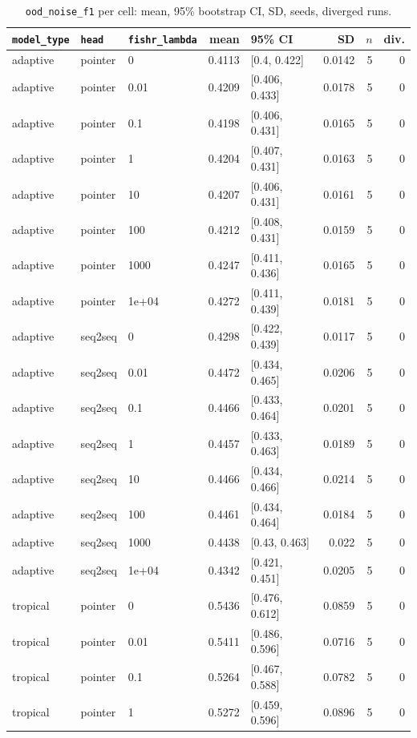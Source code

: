\documentclass[10pt]{article}
\begin{document}
{\small
\begin{longtable}{lllrlrrr}
\caption{\texttt{ood\_noise\_f1} per cell: mean, 95\% bootstrap CI, SD, seeds, diverged runs.}\label{tab:summary-ood_noise_f1}\\
\toprule
\texttt{model\_type} & \texttt{head} & \texttt{fishr\_lambda} & mean & 95\% CI & SD & $n$ & div.\\
\midrule
\endhead
adaptive & pointer & 0 & 0.4113 & [0.4, 0.422] & 0.0142 & 5 & 0\\
adaptive & pointer & 0.01 & 0.4209 & [0.406, 0.433] & 0.0178 & 5 & 0\\
adaptive & pointer & 0.1 & 0.4198 & [0.406, 0.431] & 0.0165 & 5 & 0\\
adaptive & pointer & 1 & 0.4204 & [0.407, 0.431] & 0.0163 & 5 & 0\\
adaptive & pointer & 10 & 0.4207 & [0.406, 0.431] & 0.0161 & 5 & 0\\
adaptive & pointer & 100 & 0.4212 & [0.408, 0.431] & 0.0159 & 5 & 0\\
adaptive & pointer & 1000 & 0.4247 & [0.411, 0.436] & 0.0165 & 5 & 0\\
adaptive & pointer & 1e+04 & 0.4272 & [0.411, 0.439] & 0.0181 & 5 & 0\\
adaptive & seq2seq & 0 & 0.4298 & [0.422, 0.439] & 0.0117 & 5 & 0\\
adaptive & seq2seq & 0.01 & 0.4472 & [0.434, 0.465] & 0.0206 & 5 & 0\\
adaptive & seq2seq & 0.1 & 0.4466 & [0.433, 0.464] & 0.0201 & 5 & 0\\
adaptive & seq2seq & 1 & 0.4457 & [0.433, 0.463] & 0.0189 & 5 & 0\\
adaptive & seq2seq & 10 & 0.4466 & [0.434, 0.466] & 0.0214 & 5 & 0\\
adaptive & seq2seq & 100 & 0.4461 & [0.434, 0.464] & 0.0184 & 5 & 0\\
adaptive & seq2seq & 1000 & 0.4438 & [0.43, 0.463] & 0.022 & 5 & 0\\
adaptive & seq2seq & 1e+04 & 0.4342 & [0.421, 0.451] & 0.0205 & 5 & 0\\
tropical & pointer & 0 & 0.5436 & [0.476, 0.612] & 0.0859 & 5 & 0\\
tropical & pointer & 0.01 & 0.5411 & [0.486, 0.596] & 0.0716 & 5 & 0\\
tropical & pointer & 0.1 & 0.5264 & [0.467, 0.588] & 0.0782 & 5 & 0\\
tropical & pointer & 1 & 0.5272 & [0.459, 0.596] & 0.0896 & 5 & 0\\

\end{longtable}}
\end{document}
